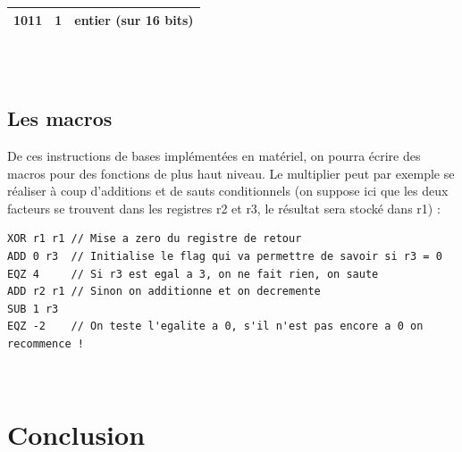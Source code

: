 \documentclass[a4paper, 12pt, twoside]{report}
\begin{document}
\begin{tabular}{|c|c|c|}
  \hline
  1011 & 1 & entier (sur 16 bits)\\
  \hline
\end{tabular}\\

\newpage~

\subsection{Les macros}

De ces instructions de bases implémentées en matériel, on pourra écrire des macros pour 
des fonctions de plus haut niveau. Le multiplier peut par exemple se réaliser à coup 
d'additions et de sauts conditionnels (on suppose ici que les deux facteurs se trouvent 
dans les registres r2 et r3, le résultat sera stocké dans r1) :\\

\begin{lstlisting}
XOR r1 r1 // Mise a zero du registre de retour
ADD 0 r3  // Initialise le flag qui va permettre de savoir si r3 = 0
EQZ 4     // Si r3 est egal a 3, on ne fait rien, on saute
ADD r2 r1 // Sinon on additionne et on decremente
SUB 1 r3
EQZ -2    // On teste l'egalite a 0, s'il n'est pas encore a 0 on recommence !
\end{lstlisting}




\newpage~

\section*{Conclusion}
\end{document}
